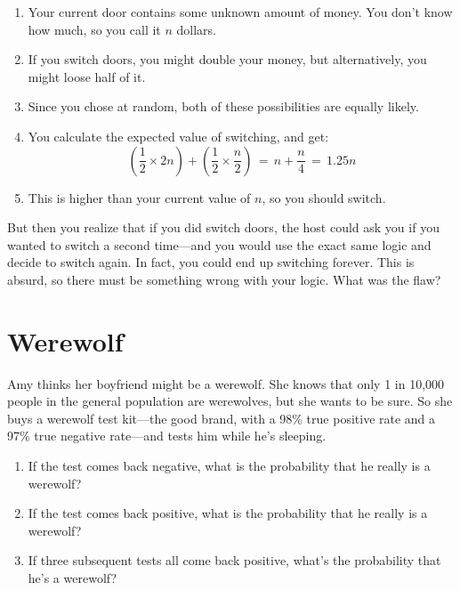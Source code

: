 \documentclass{article}
\begin{document}
\begin{enumerate}[label=\textbf{\roman*.}]
    \item Your current door contains some unknown amount of money.
    You don't know how much, so you call it $n$ dollars.

    \item If you switch doors, you might double your money, but alternatively, you might loose half of it.

    \item Since you chose at random, both of these possibilities are equally likely.

    \item You calculate the expected value of switching, and get:
    $$\left(\frac{1}{2} \times 2n\right) + \left(\frac{1}{2} \times \frac{n}{2}\right) \, = \, n + \frac{n}{4} \, = \, 1.25n$$

    \item This is higher than your current value of $n$, so you should switch.
\end{enumerate}

\noindent
But then you realize that if you did switch doors, the host could ask you if you wanted to switch a second time---and you would use the exact same logic and decide to switch again.
In fact, you could end up switching forever.
This is absurd, so there must be something wrong with your logic.
What was the flaw?


\section{Werewolf}

Amy thinks her boyfriend might be a werewolf.
She knows that only 1 in 10,000 people in the general population are werewolves, but she wants to be sure.
So she buys a werewolf test kit---the good brand, with a 98\% true positive rate and a 97\% true negative rate---and tests him while he's sleeping.

\begin{enumerate}[label=\textbf{\alph*}]
    \item If the test comes back negative, what is the probability that he really is a werewolf?

    \item If the test comes back positive, what is the probability that he really is a werewolf?

    \item If three subsequent tests all come back positive, what's the probability that he's a werewolf?
\end{enumerate}
\end{document}
